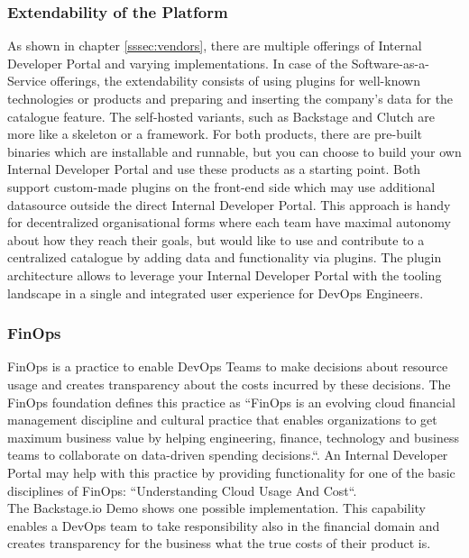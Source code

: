 \documentclass[a4paper,12pt]{article}
\begin{document}
    \subsubsection{Extendability of the Platform}
    \label{sssec:extendability}
    As shown in chapter \ref{sssec:vendors}, there are multiple offerings of Internal Developer Portal and varying
    implementations.
    In case of the Software-as-a-Service offerings, the extendability consists of using plugins for well-known
    technologies or products and preparing and inserting the company's data for the catalogue feature.
    The self-hosted variants, such as Backstage and Clutch are more like a skeleton or a framework.
    For both products, there are pre-built binaries which are installable and runnable, but you can choose to build your
    own Internal Developer Portal and use these products as a starting point.
    Both support custom-made plugins on the front-end side which may use additional datasource outside the direct
    Internal Developer Portal.
    This approach is handy for decentralized organisational forms where each team have maximal autonomy about how they
    reach their goals, but would like to use and contribute to a centralized catalogue by adding data and functionality
    via plugins.
    The plugin architecture allows to leverage your Internal Developer Portal with the tooling landscape in a
    single and integrated user experience for DevOps Engineers.

    \subsubsection{FinOps}
    \label{sssec:finops}
    FinOps is a practice to enable DevOps Teams to make decisions about resource usage and creates transparency
    about the costs incurred by these decisions.
    The FinOps foundation defines\parencite{finopsdefinition} this practice as ``FinOps is an evolving cloud financial
    management discipline and cultural practice that enables organizations to get maximum business value by helping
    engineering, finance, technology and business teams to collaborate on data-driven spending decisions.``.
    An Internal Developer Portal may help with this practice by providing functionality for one of the basic disciplines
    of FinOps: ``Understanding Cloud Usage And Cost``.\\
    The Backstage.io Demo\parencite{backstagedemocost} shows one possible implementation.
    This capability enables a DevOps team to take responsibility also in the financial domain and creates transparency
    for the business what the true costs of their product is.
\end{document}
